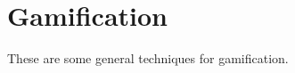 \section*{Gamification}
\begin{refsection}
These are some general techniques for gamification.
\end{refsection}

